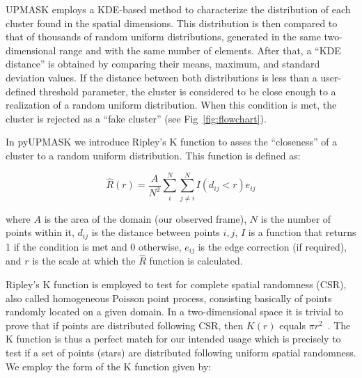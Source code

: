 \documentclass[draft]{aa}
\begin{document}
 UPMASK employs a KDE-based method to characterize the distribution of each
 cluster found in the spatial dimensions. This distribution is then compared
 to that of thousands of random uniform distributions, generated in the same
 two-dimensional range and with the same number of elements. After that,
 a ``KDE distance'' is obtained by comparing their means, maximum, and
 standard deviation values.
 If the distance between both distributions is less than a user-defined
 threshold parameter, the cluster is considered to be close enough to a
 realization of a random uniform distribution. When this condition is met, the
 cluster is rejected as a ``fake cluster'' (see Fig~\ref{fig:flowchart}).

 In pyUPMASK we introduce Ripley's K function \citep{ripley_1976,ripley_1979}
 to asses the ``closeness'' of a cluster to a random uniform distribution. This
 function is defined as:

 \begin{equation}
 \hat{R}(r) = \frac{A}{N^2} \sum_i^N \sum_{j\neq i}^N I(d_{ij} < r) e_{ij}
 \end{equation}

 \noindent where $A$ is the area of the domain (our observed frame), $N$ is
 the number of points within it, $d_{ij}$ is the distance between points
 $i,j$, $I$ is a function that returns 1 if the condition is met and 0
 otherwise, $e_{ij}$ is the edge correction (if required), and $r$ is the
 scale at which the $ \hat{R}$ function is calculated.

 Ripley's K function is employed to test for complete spatial randomness (CSR),
 also called homogeneous Poisson point process, consisting basically of
 points randomly located on a given domain. In a two-dimensional space it is
 trivial to prove that if points are distributed following CSR, then $K(r)$
 equals $\pi r^2$~\citep{Streib_2011}.
 The K function is thus a perfect match for our intended usage which is
 precisely to test if a set of points (stars) are distributed following
 uniform spatial randomness.
 We employ the form of the K function given by:


\end{document}
